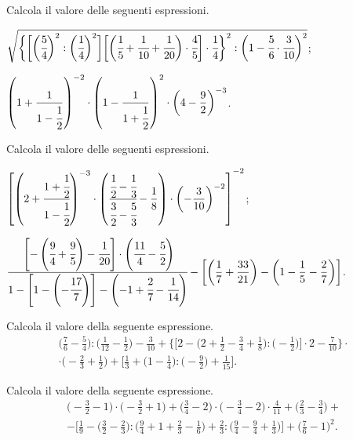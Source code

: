 \begin{esercizio}[\Ast]
 Calcola il valore delle seguenti espressioni.
\begin{enumeratea}
\spazielenx
\item $\displaystyle{\sqrt{\bigg\{\bigg[\bigg(\cfrac{5}{4}\bigg)^{2}:\bigg(\cfrac{1}{4}\bigg)^{2}\bigg]%
\bigg[\bigg(\cfrac{1}{5}+\cfrac{1}{10}+\cfrac{1}{20}\bigg)\cdot\cfrac{4}{5}\bigg]\cdot\cfrac{1}{4}\bigg\}^{2}%
:\bigg(1-\cfrac{5}{6}\cdot\cfrac{3}{10}\bigg)^{2}}}$;
\item $\displaystyle{\left(1+\frac{1}{1-\cfrac{1}{2}}\right)^{-2}\cdot\left(1-\frac{1}{1+\cfrac{1}{2}}\right)^{2}\cdot%
\bigg(4-\frac{9}{2}\bigg)^{-3}}$.
\end{enumeratea}
\end{esercizio}

\begin{esercizio}[\Ast]
 Calcola il valore delle seguenti espressioni.
\begin{enumeratea}
\item $\displaystyle{\left[\left(2+\cfrac{1+\cfrac{1}{2}}{1-\cfrac{1}{2}}\right)^{-3}\cdot\left(\cfrac{\cfrac{1}{2}-\cfrac{1}{3}}%
{\cfrac{3}{2}-\cfrac{5}{3}}-\frac{1}{8}\right)\cdot\left(-{\frac{3}{10}}\right)^{-2}\right]^{-2}}$;
\item $\displaystyle{\cfrac{\left[-\left(\cfrac{9}{4}+\cfrac{9}{5}\right)-\cfrac{1}{20}\right]\cdot\left(\cfrac{11}{4}-\cfrac{5}{2}\right)}%
{1-\left[1-\left(-{\cfrac{17}{7}}\right)\right]-\left(-1+\cfrac{2}{7}-\cfrac{1}{14}\right)}%
-\bigg[\bigg(\frac{1}{7}+\frac{33}{21}\bigg)-\bigg(1-\frac{1}{5}-\frac{2}{7}\bigg)\bigg]}$.

\end{enumeratea}
\end{esercizio}

\begin{esercizio}[\Ast]
 Calcola il valore della seguente espressione.
\begin{multline*}
\bigg(\frac{7}{6}-\frac{5}{4}\bigg):\bigg(\frac{1}{12}-\frac{1}{2}\bigg)-\frac{3}{10}+\bigg\{\bigg[2-\bigg(2+\frac{1}{2}%
-\frac{3}{4}+\frac{1}{8}\bigg):\bigg(-{\frac{1}{2}}\bigg)\bigg]\cdot2-\frac{7}{10}\bigg\}\cdot\\
\cdot\bigg(-{\frac{2}{3}}+\frac{1}{2}\bigg)%
+\bigg[\frac{1}{3}+\bigg(1-\frac{1}{4}\bigg):\bigg(-{\frac{9}{2}}\bigg)+\frac{1}{15}\bigg].
\end{multline*}
\end{esercizio}

\begin{esercizio}[\Ast]
 Calcola il valore della seguente espressione.
\begin{multline*}
\bigg(-{\frac{3}{2}}-1\bigg)\cdot%
\bigg(-{\frac{3}{2}}+1\bigg)+\bigg(\frac{3}{4}-2\bigg)\cdot%
\bigg(-{\frac{3}{4}}-2\bigg)\cdot {\frac{4}{11}}+\bigg(\frac{2}{3}-\frac{3}{4}\bigg)+\\%
-\bigg[\frac{1}{9}-\bigg(\frac{3}{2}-\frac{2}{3}\bigg):\bigg(\frac{9}{4}+1+%
\frac{2}{3}-\frac{1}{6}\bigg)+\frac{2}{3}:\bigg(\frac{9}{4}-\frac{9}{4}%
+\frac{1}{3}\bigg)\bigg]+\bigg(\frac{7}{6}-1\bigg)^{2}.
\end{multline*}
\end{esercizio}

